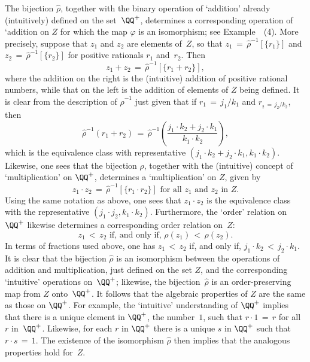 {{{        The bijection $\hat{{\rho}}$, together with the binary operation of `addition' already (intuitively) defined on the set~${\QQ}^{+}$,
    determines a corresponding operation of `addition on $Z$ for which the map ${\varphi}$ is an isomorphism; see Example~~(4).
    More precisely, suppose that $z_{1}$ and $z_{2}$ are elements of~$Z$,
    so that $z_{1} \,=\, \hat{{\rho}}^{-1}[\{r_{1}\}]$ and $z_{2} \,=\, \hat{{\rho}}^{-1}[\{r_{2}\}]$ for positive rationals $r_{1}$ and~$r_{2}$. Then
        \begin{displaymath}
        z_{1} + z_{2} \,=\, \hat{{\rho}}^{-1}[\{r_{1}+r_{2}\}],
        \end{displaymath}
    where the addition on the right is the (intuitive) addition of positive rational numbers,
    while that on the left is the addition of elements of $Z$ being defined.
    It is clear from the description of $\hat{{\rho}}^{-1}$ just given that if $r_{1} \,=\, j_{1}/k_{1}$ and $r_{_{2} \,=\, j_{2}/k_{2}}$,
    then 
        \begin{displaymath}
        \hat{{\rho}}^{-1}(r_{1} + r_{2})
    \,=\, 
        \hat{{\rho}}^{-1}\left(\frac{j_{1}{\cdot}k_{2} + j_{2}{\cdot}k_{1}}{k_{1}{\cdot}k_{2}}\right),
        \end{displaymath}
    which is the equivalence class with representative $(j_{1}{\cdot}k_{2} + j_{2}{\cdot}k_{1}, k_{1}{\cdot}k_{2})$.
    Likewise, one sees that the bijection ${\rho}$, together with the (intuitive) concept of `multiplication' on ${\QQ}^{+}$,
    determines a `multiplication' on $Z$, given by
        \begin{displaymath}
        z_{1}{\cdot}z_{2} \,=\, \hat{{\rho}}^{-1}[\{r_{1}{\cdot}r_{2}\}] \mbox{ for all $z_{1}$ and $z_{2}$ in $Z$}.
        \end{displaymath}
    Using the same notation as above, one sees that $z_{1}{\cdot}z_{2}$ is the equivalence class
    with the representative $(j_{1}{\cdot}j_{2}, k_{1}{\cdot}k_{2})$.
    Furthermore, the `order' relation on ${\QQ}^{+}$ likewise determines a corresponding order relation on~$Z$:
        \begin{displaymath}
        z_{1}\,<\,z_{2} \mbox{ if, and only if, } {\rho}(z_{1})\,<\,{\rho}(z_{2}).
        \end{displaymath}
    In terms of fractions used above, one has $z_{1}\,<\,z_{2}$ if, and only if, $j_{1}{\cdot}k_{2}\,<\,j_{2}{\cdot}k_{1}$.
    It is clear that the bijection $\hat{{\rho}}$ is an isomorphism between the operations of addition and multiplication,
    just defined on the set $Z$, and the corresponding `intuitive' operations on~${\QQ}^{+}$;
    likewise, the bijection~$\hat{{\rho}}$ is an order-preserving map from $Z$ onto~${\QQ}^{+}$.
    It follows that the algebraic properties of $Z$ are the same as those on ${\QQ}^{+}$.
    For example, the `intuitive' understanding of ${\QQ}^{+}$ implies that there is a unique element in ${\QQ}^{+}$, the number~$1$, such that $r{\cdot}1\,=\, r$
    for all $r$ in~${\QQ}^{+}$. Likewise, for each $r$ in ${\QQ}^{+}$ there is a unique $s$ in ${\QQ}^{+}$ such that $r{\cdot}s \,=\, 1$.
    The existence of the isomorphism $\hat{{\rho}}$ then implies that the analogous properties hold for~$Z$.

}}}
